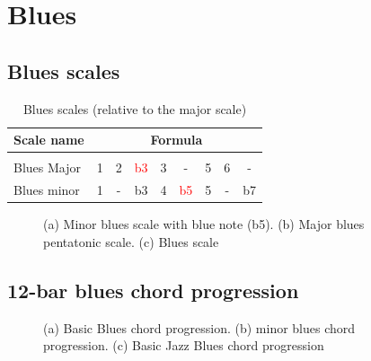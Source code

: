 \documentclass{article}
\begin{document}
\clearpage
\section{Blues}

\subsection{Blues scales}

\begin{table}[!h]
	\caption{Blues scales (relative to the major scale)}
	\centering
	\begin{tabular}{l|cccccccc}
		Scale name  & \multicolumn{8}{c}{Formula} \\
		\hline \hline \vspace{-0.4cm} \\
		Blues Major   & 1 & 2  & \textcolor{red}{b3} & 3  &   -   & 5  & 6  &  -  \\
		Blues minor   & 1 &  - & b3 & 4  & \textcolor{red}{b5} &  5  & - &  b7 \\
	\end{tabular}
	\label{tab: }
\end{table}


\begin{figure}[!h]
	\centering
	\hspace*{-1cm}
	\scalebox{0.7}{}
	\hspace*{-1cm}
	\scalebox{0.7}{}
	\hspace*{-1cm}
	\scalebox{0.7}{}
	\caption{(a) Minor blues scale with blue note (b5). (b) Major blues pentatonic scale. (c) Blues scale  }
	\label{fig:}
\end{figure}


\subsection{12-bar blues chord progression}

\begin{figure}[!h]
    \centering
	\hspace*{0cm}
	\scalebox{1.5}{}
	\scalebox{1.5}{}
	\scalebox{1.5}{}
	\caption{(a) Basic Blues chord progression. (b) minor blues chord progression. (c) Basic Jazz Blues chord progression}
	\label{fig:}
\end{figure}
\end{document}
